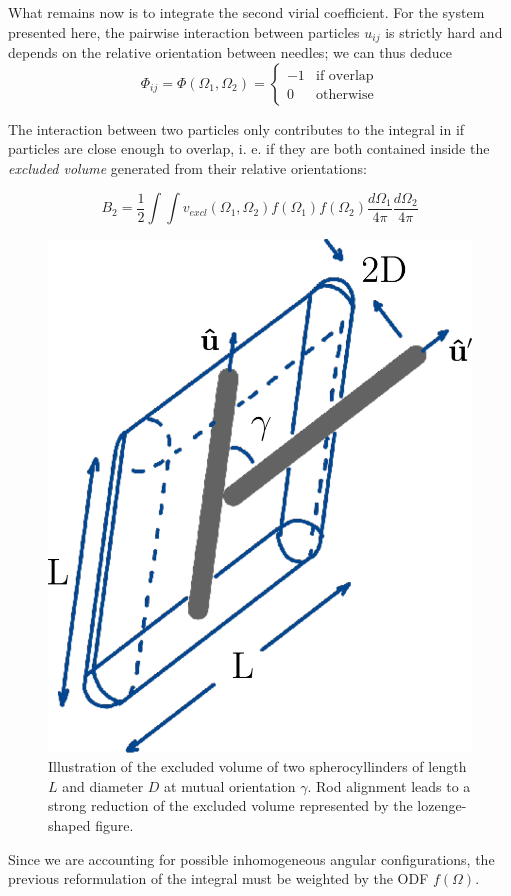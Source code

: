What remains now is to integrate the second virial coefficient. For the system presented here, the pairwise interaction between particles $u_{ij}$ is strictly hard and depends on the relative orientation between needles; we can thus deduce
\begin{equation}
\Phi_{ij}=\Phi(\Omega_1,\Omega_2)=
\begin{cases}
-1 & \textrm{if overlap}\\
0 & \textrm{otherwise}
\end{cases}
\end{equation}

The interaction between two particles only contributes to the integral in  if particles are close enough to overlap, i. e. if they are both contained inside the {\em excluded volume} generated from their relative orientations:

\begin{equation}
B_2 = \frac{1}{2} \int \int v_{excl}(\Omega_1,\Omega_2) f(\Omega_1) f(\Omega_2)\frac{d\Omega_1}{4\pi}  \frac{d\Omega_2}{4\pi}
 \label{B2_exclv}
\end{equation}

\begin{figure}
\includegraphics[width= 0.4 \columnwidth]{figures/chapter-1/exclvol}
\caption[Illustration of the excluded volume of two spherocyllinders  of length $L$ and diameter $D$ at mutual orientation $\gamma$]{ \label{introfig3} Illustration of the excluded volume of two spherocyllinders  of length $L$ and diameter $D$ at mutual orientation $\gamma$. Rod alignment leads to a strong reduction of the excluded volume represented by the lozenge-shaped figure.}
\end{figure}

Since we are accounting for possible inhomogeneous angular configurations, the previous reformulation of the integral must be weighted by the ODF $f(\Omega)$.

